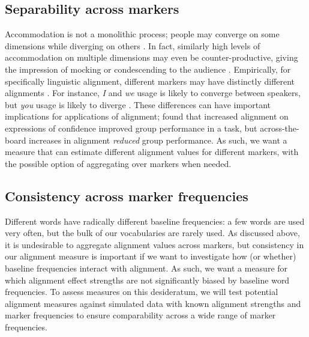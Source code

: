 \documentclass{acm_proc_article-sp}
\begin{document}
\subsection{Separability across markers}

Accommodation is not a monolithic process; people may converge on some dimensions while diverging on others \cite{BilousKrauss1988,Ferrara1991}. In fact, similarly high levels of accommodation on multiple dimensions may even be counter-productive, giving the impression of mocking or condescending to the audience \cite{GilesSmith1979,GilesCouplandCoupland1991}. Empirically, for specifically linguistic alignment, different markers may have distinctly different alignments \cite{DNMGamonDumais2011,IrelandEtAl2011}. For instance, \textit{I} and \textit{we} usage is likely to converge between speakers, but \textit{you} usage is likely to diverge \cite{NiederhofferPennebaker2002,GonzalesHancockPennebaker2010}. These differences can have important implications for applications of alignment; \cite{FusaroliEtAl2012} found that increased alignment on expressions of confidence improved group performance in a task, but across-the-board increases in alignment \emph{reduced} group performance.  As such, we want a measure that can estimate different alignment values for different markers, with the possible option of aggregating over markers when needed.

\subsection{Consistency across marker frequencies} 

Different words have radically different baseline frequencies: a few words are used very often, but the bulk of our vocabularies are rarely used. As discussed above, it is undesirable to aggregate alignment values across markers, but consistency in our alignment measure is important if we want to investigate how (or whether) baseline frequencies interact with alignment.
As such, we want a measure for which alignment effect strengths are not significantly biased by baseline word frequencies. To assess measures on this desideratum, we will test potential alignment measures against simulated data with known alignment strengths and marker frequencies to ensure comparability across a wide range of marker frequencies.  %
\end{document}
